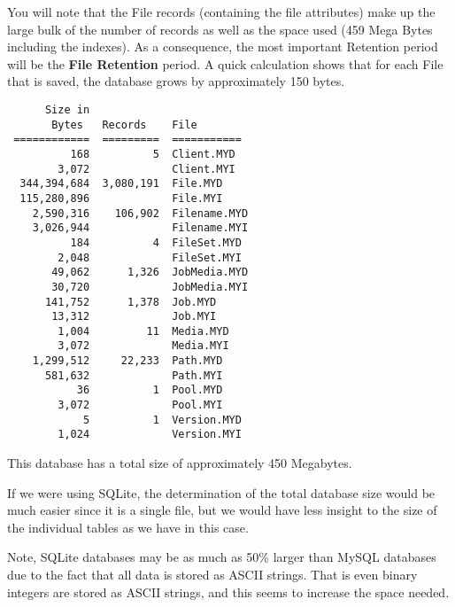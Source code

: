 You will note that the File records (containing the file attributes) make up
the large bulk of the number of records as well as the space used (459 Mega
Bytes including the indexes). As a consequence, the most important Retention
period will be the {\bf File Retention} period. A quick calculation shows that
for each File that is saved, the database grows by approximately 150 bytes. 

\footnotesize
\begin{verbatim}
      Size in
       Bytes   Records    File
 ============  =========  ===========
          168          5  Client.MYD
        3,072             Client.MYI
  344,394,684  3,080,191  File.MYD
  115,280,896             File.MYI
    2,590,316    106,902  Filename.MYD
    3,026,944             Filename.MYI
          184          4  FileSet.MYD
        2,048             FileSet.MYI
       49,062      1,326  JobMedia.MYD
       30,720             JobMedia.MYI
      141,752      1,378  Job.MYD
       13,312             Job.MYI
        1,004         11  Media.MYD
        3,072             Media.MYI
    1,299,512     22,233  Path.MYD
      581,632             Path.MYI
           36          1  Pool.MYD
        3,072             Pool.MYI
            5          1  Version.MYD
        1,024             Version.MYI
\end{verbatim}
\normalsize

This database has a total size of approximately 450 Megabytes. 

If we were using SQLite, the determination of the total database size would be
much easier since it is a single file, but we would have less insight to the
size of the individual tables as we have in this case. 

Note, SQLite databases may be as much as 50\% larger than MySQL databases due
to the fact that all data is stored as ASCII strings. That is even binary
integers are stored as ASCII strings, and this seems to increase the space
needed. 
